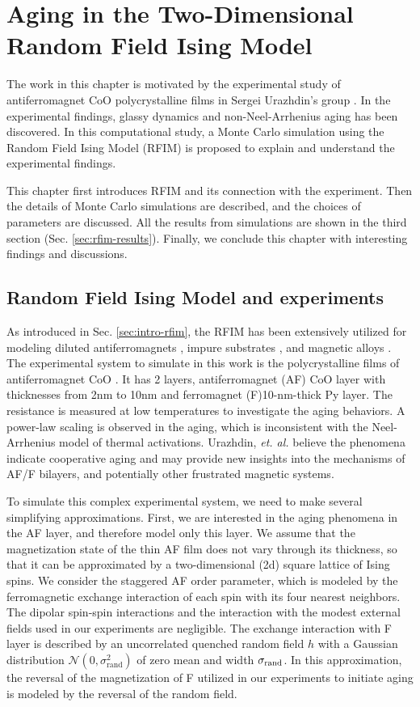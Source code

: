 
\chapter{Aging in the Two-Dimensional Random Field Ising Model}
\label{chap-rfim}
The work in this chapter is motivated by the experimental study of antiferromagnet CoO polycrystalline films in Sergei Urazhdin's group \cite{ma2016prb}. In the experimental findings, glassy dynamics and non-Neel-Arrhenius aging has been discovered. In this computational study, a Monte Carlo simulation using the Random Field Ising Model (RFIM) is proposed to explain and understand the experimental findings.

This chapter first introduces RFIM and its connection with the experiment. Then the details of Monte Carlo simulations are described, and the choices of parameters are discussed. All the results from simulations  are shown in the third section (Sec. \ref{sec:rfim-results}). Finally, we conclude this chapter with interesting findings and discussions.
 
\section{Random Field Ising Model and experiments }
\label{sec:rfim-model}
As introduced in Sec. \ref{sec:intro-rfim}, the RFIM has been extensively utilized for modeling diluted antiferromagnets \cite{fernandez1988random}, impure substrates \cite{villain1982commensurate}, and magnetic alloys \cite{fisher1988theory}. The experimental system to simulate in this work is the polycrystalline films of antiferromagnet CoO \cite{ma2016prb}. It has 2 layers, antiferromagnet (AF) CoO layer with thicknesses from 2nm to 10nm and ferromagnet (F)10-nm-thick Py layer. The resistance is measured at low temperatures to investigate the aging behaviors. A power-law scaling is observed in the aging, which is inconsistent with the Neel-Arrhenius model of thermal activations. Urazhdin, {\it et. al.} \cite{ma2016prb} believe the phenomena indicate cooperative aging and may  provide new insights into the mechanisms of AF/F bilayers, and potentially other frustrated magnetic systems.


To simulate this complex experimental system,  we need to make several simplifying approximations. First, we are interested in the aging phenomena in the AF layer, and therefore model only this layer. We assume that the magnetization state of the thin AF film does not vary through its thickness, so that it can be approximated by a two-dimensional (2d) square lattice of Ising spins. We consider the staggered AF order parameter, which is modeled by the ferromagnetic exchange interaction of each spin with its four nearest neighbors. The dipolar spin-spin interactions and the interaction with the modest external fields used in our experiments are negligible. The exchange interaction with F layer is described by an uncorrelated quenched random field $h$ with a Gaussian distribution $\mathcal{N}(0,\sigma_{\text{rand}}^{2})$ of zero mean and width $\sigma_{{\rm rand}}$. In this approximation, the reversal of the magnetization of F utilized in our experiments to initiate aging is modeled by the reversal of the random field.

